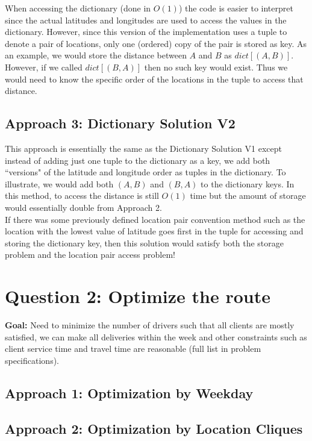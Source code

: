 \documentclass{article}
\begin{document}
When accessing the dictionary (done in $O(1)$) the code is easier to interpret since the actual latitudes and longitudes are used to access the values in the dictionary.  However, since this version of the implementation uses a tuple to denote a pair of locations, only one (ordered) copy of the pair is stored as key.  As an example, we would store the distance between $A$ and $B$ as $dict[(A,B)]$.  However, if we called $dict[(B,A)]$ then no such key would exist.  Thus we would need to know the specific order of the locations in the tuple to access that distance. 

\subsection{Approach 3: Dictionary Solution V2}
This approach is essentially the same as the Dictionary Solution V1 except instead of adding just one tuple to the dictionary as a key, we add both ``versions" of the latitude and longitude order as tuples in the dictionary.  To illustrate, we would add both $(A,B)$ and $(B,A)$ to the dictionary keys.  In this method, to access the distance is still $O(1)$ time but the amount of storage would essentially double from Approach 2.\\

If there was some previously defined location pair convention method such as the location with the lowest value of latitude goes first in the tuple for accessing and storing the dictionary key, then this solution would satisfy both the storage problem and the location pair access problem!

\section{Question 2: Optimize the route}
\textbf{Goal:} Need to minimize the number of drivers such that all clients are
mostly satisfied, we can make all deliveries within the week and other constraints
such as client service time and travel time are reasonable (full list in problem specifications).

\subsection{Approach 1: Optimization by Weekday}

\subsection{Approach 2: Optimization by Location Cliques}
\end{document}
